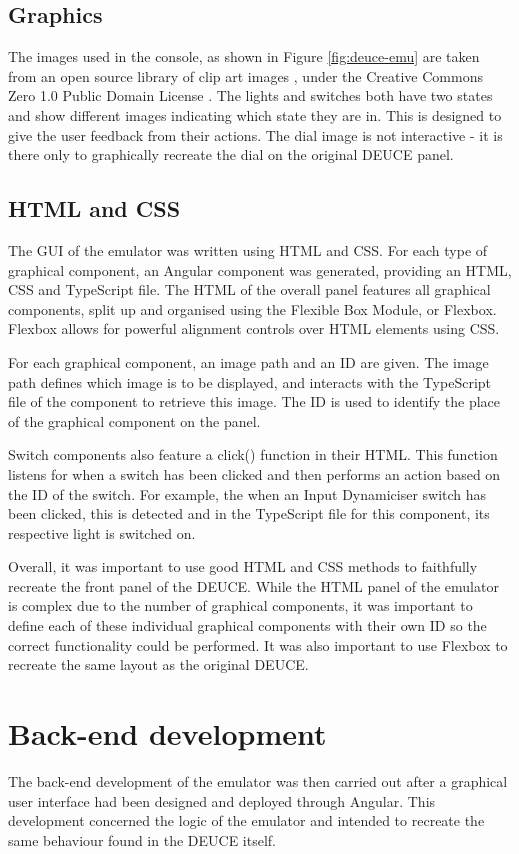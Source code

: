 \documentclass{l4proj}
\begin{document}
\subsection{Graphics}
The images used in the console, as shown in Figure \ref{fig:deuce-emu} are taken from an open source library of clip art images \citep{openclipart}, under the Creative Commons Zero 1.0 Public Domain License \citep{creativecommons}. The lights and switches both have two states and show different images indicating which state they are in. This is designed to give the user feedback from their actions. The dial image is not interactive - it is there only to graphically recreate the dial on the original DEUCE panel.

\subsection{HTML and CSS}
The GUI of the emulator was written using HTML and CSS. For each type of graphical component, an Angular component was generated, providing an HTML, CSS and TypeScript file. The HTML of the overall panel features all graphical components, split up and organised using the Flexible Box Module, or Flexbox. Flexbox allows for powerful alignment controls over HTML elements using CSS. 

For each graphical component, an image path and an ID are given. The image path defines which image is to be displayed, and interacts with the TypeScript file of the component to retrieve this image. The ID is used to identify the place of the graphical component on the panel.

Switch components also feature a click() function in their HTML. This function listens for when a switch has been clicked and then performs an action based on the ID of the switch. For example, the when an Input Dynamiciser switch has been clicked, this is detected and in the TypeScript file for this component, its respective light is switched on.

Overall, it was important to use good HTML and CSS methods to faithfully recreate the front panel of the DEUCE. While the HTML panel of the emulator is complex due to the number of graphical components, it was important to define each of these individual graphical components with their own ID so the correct functionality could be performed. It was also important to use Flexbox to recreate the same layout as the original DEUCE.

\section{Back-end development}
The back-end development of the emulator was then carried out after a graphical user interface had been designed and deployed through Angular. This development concerned the logic of the emulator and intended to recreate the same behaviour found in the DEUCE itself.
\end{document}
